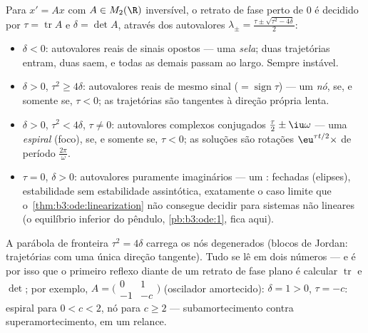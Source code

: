 \begin{example}
\label{ex:b3:ode:planeclassification}
Para $x' = Ax$ com $A \in M_2(\R)$ inversível, o retrato de fase perto de $0$ é
decidido por $\tau = \operatorname{tr}A$ e $\delta = \det A$, através dos autovalores $\lambda_\pm
= \frac{\tau \pm \sqrt{\tau^2 - 4\delta}}2$:
\begin{itemize}
  \item $\delta < 0$: autovalores reais de sinais opostos --- uma
        \emph{sela}; duas trajetórias entram, duas saem, e todas as
        demais passam ao largo. Sempre instável.
  \item $\delta > 0$, $\tau^2 \geq 4\delta$: autovalores reais de mesmo sinal ($= \operatorname{sign}\tau$) --- um
        \emph{nó},  se, e somente se, $\tau < 0$; as trajetórias são
        tangentes à direção própria lenta.
  \item $\delta > 0$, $\tau^2 < 4\delta$, $\tau \neq 0$: autovalores complexos conjugados $\frac\tau2 \pm
        \iu\omega$ ---
        uma \emph{espiral} (foco),  se, e somente se, $\tau < 0$; as
        soluções são rotações $\eu^{\tau t/2}\times$ de período $\frac{2\pi}\omega$.
  \item $\tau = 0$, $\delta > 0$: autovalores puramente imaginários --- um
        \emph{}:  fechadas (elipses), estabilidade sem
        estabilidade assintótica, exatamente o caso limite que
        o~\cref{thm:b3:ode:linearization} não consegue decidir para sistemas não
        lineares (o equilíbrio inferior do pêndulo, \cref{pb:b3:ode:1}, fica
        aqui).
\end{itemize}
A parábola de fronteira $\tau^2 = 4\delta$ carrega os nós degenerados (blocos de
Jordan: trajetórias com uma única direção tangente). Tudo se lê em dois
números --- e é por isso que o primeiro reflexo diante de um retrato de
fase plano é calcular $\operatorname{tr}$ e $\det$; por exemplo, $A = \bigl(\begin{smallmatrix}0 & 1\\ -1 &
-c\end{smallmatrix}\bigr)$ (oscilador
amortecido): $\delta = 1 >
0$, $\tau = -c$: espiral  para $0 < c < 2$, nó  para
$c \geq 2$ --- subamortecimento contra superamortecimento, em um relance.
\end{example}


